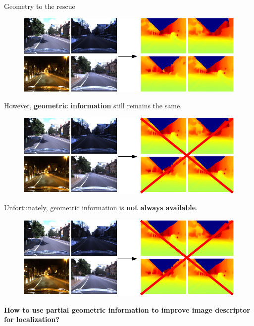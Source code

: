 \begin{frame}{Geometry to the rescue}
	\only<1>
	{
	\vfill
	\begin{figure}
		\centering
		\includegraphics[width=0.8\linewidth]{vect/intro/fig4/2}
	\end{figure}
	\vfill	
	However, \textbf{geometric information} still remains the same.
	}
	{
	\vfill
	\begin{figure}
		\centering
		\includegraphics[width=0.8\linewidth]{vect/intro/fig4/3}
	\end{figure}
	\vfill	
	Unfortunately, geometric information is \textbf{not always available}.
	}
	{
	\vfill
	\centering
	\begin{figure}
		\includegraphics[width=0.6\linewidth]{vect/intro/fig4/3}
	\end{figure}
	\vfill	
	\textbf{How to use partial geometric information to improve image descriptor for localization?}
	}
\end{frame}
